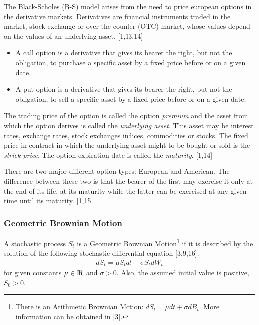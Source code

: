 \documentclass[12pt,twoside]{reedthesis}
\theoremstyle{definition}
\theoremstyle{definition}
\theoremstyle{remark}
\begin{document}
  The Black-Scholes (B-S) model arises from the need to price european
  options in the derivative markets. Derivatives are financial instruments
  traded in the market, stock exchange or over-the-counter (OTC) market,
  whose values depend on the values of an underlying asset. {[}1,13,14{]}
  \begin{itemize}
  \item
    A call option is a derivative that gives its bearer the right, but not
    the obligation, to purchase a specific asset by a fixed price before
    or on a given date.
  \item
    A put option is a derivative that gives its bearer the right, but not
    the obligation, to sell a specific asset by a fixed price before or on
    a given date.
  \end{itemize}
  The trading price of the option is called the option \emph{premium} and
  the asset from which the option derives is called the \emph{underlying
  asset}. This asset may be interest rates, exchange rates, stock
  exchanges indices, commodities or stocks. The fixed price in contract in
  which the underlying asset might to be bought or sold is the
  \emph{strick price}. The option expiration date is called the
  \emph{maturity}. {[}1,14{]}
  
  There are two major different option types: European and American. The
  difference between these two is that the bearer of the first may
  exercise it only at the end of its life, at its maturity while the
  latter can be exercised at any given time until its maturity. {[}1,15{]}
  
  \subsubsection{Geometric Brownian Motion}\label{gbm}
  
  A stochastic process \(S_t\) is a Geometric Brownian Motion\footnote{There
    is an Arithmetic Brownian Motion: \(dS_t = \mu dt + \sigma dB_t\).
    More information can be obtained in {[}3{]}.} if it is described by
  the solution of the following stochastic differential equation
  {[}3,9,16{]}.
  \begin{align}
  dS_t = \mu S_t dt + \sigma S_t dW_t
  \end{align}
  \noindent
  for given constants \(\mu \in {\rm I\!R}\) and \(\sigma > 0\). Also, the
  assumed initial value is positive, \(S_0 >0\).
  
\end{document}
